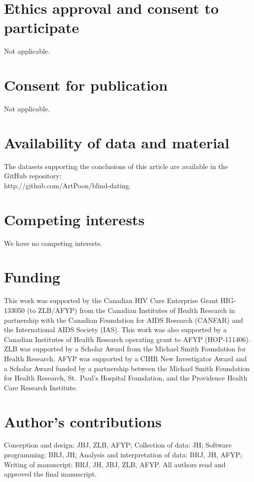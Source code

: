 \documentclass{bmcart}
\begin{document}
\begin{backmatter}
\section*{Ethics approval and consent to participate}
Not applicable.

\section*{Consent for publication}
Not applicable.

\section*{Availability of data and material}
The datasets supporting the conclusions of this article are available in the GitHub repository: \\ \mbox{http://github.com/ArtPoon/blind-dating}.

\section*{Competing interests}
We have no competing interests.

\section*{Funding}
This work was supported by the Canadian HIV Cure Enterprise Grant HIG-133050 (to ZLB/AFYP) from the Canadian Institutes of Health Research in partnership with the Canadian Foundation for AIDS Research (CANFAR) and the International AIDS Society (IAS).
This work was also supported by a Canadian Institutes of Health Research operating grant to AFYP (HOP-111406).
ZLB was supported by a Scholar Award from the Michael Smith Foundation for Health Research.
AFYP was supported by a CIHR New Investigator Award and a Scholar Award funded by a partnership between the Michael Smith Foundation for Health Research, St.~Paul's Hospital Foundation, and the Providence Health Care Research Institute.


\section*{Author's contributions}
Conception and design: JBJ, ZLB, AFYP; Collection of data: JH; Software programming: BRJ, JH; Analysis and interpretation of data: BRJ, JH, AFYP; Writing of manuscript: BRJ, JH, JBJ, ZLB, AFYP. All authors read and approved the final manuscript.


\end{backmatter}
\end{document}
